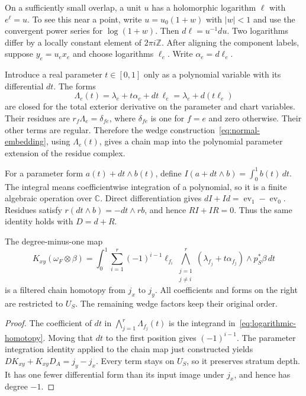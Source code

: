 On a sufficiently small overlap, a unit $u$ has a holomorphic logarithm $\ell$ with $e^\ell=u$.
To see this near a point, write $u=u_0(1+w)$ with $|w|<1$ and use the convergent power series for $\log(1+w)$.
Then $d\ell=u^{-1}du$.
Two logarithms differ by a locally constant element of $2\pi i\mathbb Z$.
After aligning the component labels, suppose $y_e=u_ex_e$ and choose logarithms $\ell_e$.
Write $\alpha_e=d\ell_e$.

Introduce a real parameter $t\in[0,1]$ only as a polynomial variable with its differential $dt$.
The forms
\[
\Lambda_e(t)=\lambda_e+t\alpha_e+dt\,\ell_e
=\lambda_e+d(t\ell_e)
\]
are closed for the total exterior derivative on the parameter and chart variables.
Their residues are $r_f\Lambda_e=\delta_{fe}$, where $\delta_{fe}$ is one for $f=e$ and zero otherwise.
Their other terms are regular.
Therefore the wedge construction~\eqref{eq:normal-embedding}, using $\Lambda_e(t)$,
gives a chain map into the polynomial parameter extension of the residue complex.

For a parameter form $a(t)+dt\wedge b(t)$, define
$I(a+dt\wedge b)=\int_0^1 b(t)\,dt$.
The integral means coefficientwise integration of a polynomial, so it is a finite algebraic operation over $\mathbb C$.
Direct differentiation gives
$dI+Id=\operatorname{ev}_1-\operatorname{ev}_0$.
Residues satisfy $r(dt\wedge b)=-dt\wedge rb$, and hence $RI+IR=0$.
Thus the same identity holds with $D=d+R$.

\begin{proposition}
\label{prop:logarithmic-homotopy}
The degree-minus-one map
\begin{equation}
\label{eq:logarithmic-homotopy}
K_{xy}(\omega_F\otimes\beta)
=\int_0^1\sum_{i=1}^{r}(-1)^{i-1}\ell_{f_i}
\bigwedge_{\substack{j=1\\j\ne i}}^r
(\lambda_{f_j}+t\alpha_{f_j})\wedge p_S^*\beta\,dt
\end{equation}
is a filtered chain homotopy from $j_x$ to $j_y$.
All coefficients and forms on the right are restricted to $U_S$.
The remaining wedge factors keep their original order.
\end{proposition}

\begin{proof}
The coefficient of $dt$ in $\bigwedge_{j=1}^r\Lambda_{f_j}(t)$
is the integrand in~\eqref{eq:logarithmic-homotopy}.
Moving that $dt$ to the first position gives $(-1)^{i-1}$.
The parameter integration identity applied to the chain map just constructed yields
$DK_{xy}+K_{xy}D_A=j_y-j_x$.
Every term stays on $U_S$, so it preserves stratum depth.
It has one fewer differential form than its input image under $j_x$, and hence has degree $-1$.
\end{proof}

